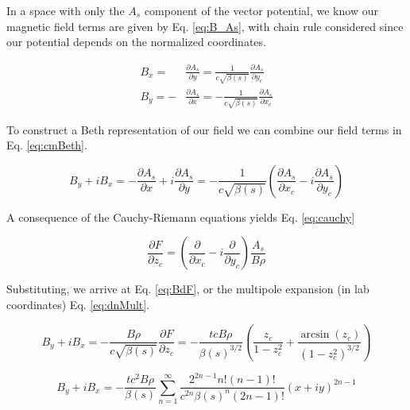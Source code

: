 In a space with only the $A_s$ component of the vector potential, we know our magnetic field terms are given by Eq. \ref{eq:B_As}, with chain rule considered since our potential depends on the normalized coordinates.

\begin{equation} \label{eq:B_As}
\begin{split}
	B_x = &\frac{\partial A_s}{\partial y} = \frac{1}{c\sqrt{\beta(s)}}\frac{\partial A_s}{\partial y_c}\\
	B_y = -&\frac{\partial A_s}{\partial x} = -\frac{1}{c\sqrt{\beta(s)}}\frac{\partial A_s}{\partial x_c}
\end{split}
\end{equation}

To construct a Beth representation of our field we can combine our field terms in Eq. \ref{eq:cmBeth}.

\begin{equation} \label{eq:cmBeth}
	B_y + i B_x  = -\frac{\partial A_s}{\partial x} + i\frac{\partial A_s}{\partial y} = -\frac{1}{c\sqrt{\beta(s)}}\left(\frac{\partial A_s}{\partial x_c} - i\frac{\partial A_s}{\partial y_c}\right)
\end{equation}

A consequence of the Cauchy-Riemann equations yields Eq. \ref{eq:cauchy}

\begin{equation} \label{eq:cauchy}
	\frac{\partial F}{\partial z_c} = \left(\frac{\partial }{\partial x_c} - i\frac{\partial }{\partial y_c}\right) \frac{A_s}{B\rho}
\end{equation}

Substituting, we arrive at Eq. \ref{eq:BdF}, or the multipole expansion (in lab coordinates) Eq. \ref{eq:dnMult}.

\begin{equation} \label{eq:BdF}
	B_y + i B_x  = -\frac{B\rho}{c\sqrt{\beta(s)}}\frac{\partial F}{\partial z_c} = - \frac{t c B\rho}{\beta(s)^{3/2}} \left( \frac{z_c}{1 - z_c^2} + \frac{\arcsin{(z_c)}}{\left(1-z_c^2\right)^{3/2}}\right)
\end{equation}

\begin{equation} \label{eq:dnMult}
	B_y + i B_x = - \frac{t c^2 B\rho}{\beta(s)} \sum_{n=1}^{\infty} \frac{2^{2n-1}n!(n-1)!}{c^{2n}\beta(s)^n(2n-1)!} (x + i y)^{2n -1}
\end{equation}

